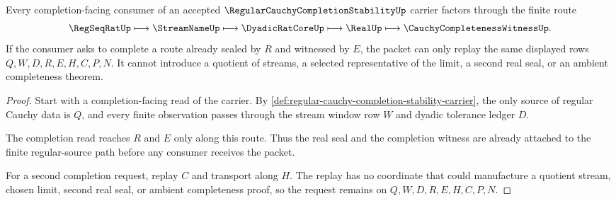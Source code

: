 \begin{theorem}
\label{thm:regular-cauchy-completion-stability-idempotence-boundary}
Every completion-facing consumer of an accepted $\RegularCauchyCompletionStabilityUp$ carrier factors through the finite route
$$
\RegSeqRatUp \longmapsto \StreamNameUp \longmapsto \DyadicRatCoreUp \longmapsto \RealUp \longmapsto \CauchyCompletenessWitnessUp .
$$
If the consumer asks to complete a route already sealed by $R$ and witnessed by $E$, the packet can only replay the same displayed rows $Q,W,D,R,E,H,C,P,N$. It cannot introduce a quotient of streams, a selected representative of the limit, a second real seal, or an ambient completeness theorem.
\end{theorem}
\begin{proof}
Start with a completion-facing read of the carrier. By \autoref{def:regular-cauchy-completion-stability-carrier}, the only source of regular Cauchy data is $Q$, and every finite observation passes through the stream window row $W$ and dyadic tolerance ledger $D$.

The completion read reaches $R$ and $E$ only along this route. Thus the real seal and the completion witness are already attached to the finite regular-source path before any consumer receives the packet.

For a second completion request, replay $C$ and transport along $H$. The replay has no coordinate that could manufacture a quotient stream, chosen limit, second real seal, or ambient completeness proof, so the request remains on $Q,W,D,R,E,H,C,P,N$.
\end{proof}





